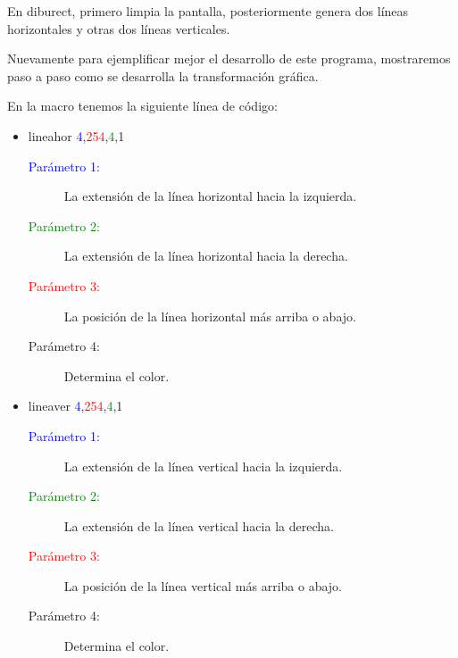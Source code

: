\documentclass[letterpaper,12 pt,titlepage]{article}
\begin{document}
    En diburect, primero limpia la pantalla, posteriormente genera dos líneas horizontales y otras dos líneas verticales.

    Nuevamente para ejemplificar mejor el desarrollo de este programa, mostraremos paso a paso como se desarrolla la transformación gráfica.
    
    En la macro tenemos la siguiente línea de código:

    \begin{itemize}
        \item lineahor \textcolor{blue}{4},\textcolor{red}{254},\textcolor{green}{4},1 
        \begin{center}
            \begin{minipage}{0.85\linewidth}
                \begin{description}
                    \item[\textcolor{blue}{Parámetro 1:}] La extensión de la línea horizontal hacia la izquierda.
                    \item[\textcolor{green}{Parámetro 2:}] La extensión de la línea horizontal hacia la derecha.
                    \item[\textcolor{red}{Parámetro 3:}] La posición de la línea horizontal más arriba o abajo.
                    \item[Parámetro 4:] Determina el color.
                \end{description}
            \end{minipage}
        \end{center}

        \item lineaver \textcolor{blue}{4},\textcolor{red}{254},\textcolor{green}{4},1 
        \begin{center}
            \begin{minipage}{0.85\linewidth}
                \begin{description}
                    \item[\textcolor{blue}{Parámetro 1:}] La extensión de la línea vertical hacia la izquierda.
                    \item[\textcolor{green}{Parámetro 2:}] La extensión de la línea vertical hacia la derecha.
                    \item[\textcolor{red}{Parámetro 3:}] La posición de la línea vertical más arriba o abajo.
                    \item[Parámetro 4:] Determina el color.
                \end{description}
            \end{minipage}
        \end{center}
    \end{itemize}
    
\end{document}
